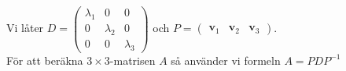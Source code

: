 Vi låter $D=\begin{pmatrix}
    \lambda_1&0&0\\
    0&\lambda_2&0\\
    0&0&\lambda_3
\end{pmatrix}$ och $P=\begin{pmatrix}
    \bm{v}_1&\bm{v}_2&\bm{v}_3
\end{pmatrix}$.\\
För att beräkna $3\times 3$-matrisen $A$ så använder vi formeln $A=PDP^{-1}$
